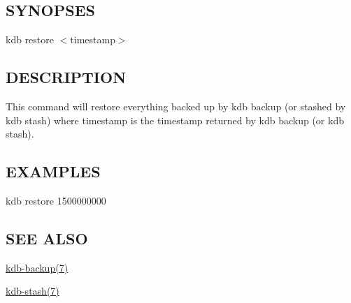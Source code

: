 \subsection*{S\+Y\+N\+O\+P\+S\+ES}

{\ttfamily kdb restore $<$timestamp$>$}

\subsection*{D\+E\+S\+C\+R\+I\+P\+T\+I\+ON}

This command will restore everything backed up by {\ttfamily kdb backup} (or stashed by {\ttfamily kdb stash}) where {\ttfamily timestamp} is the timestamp returned by {\ttfamily kdb backup} (or {\ttfamily kdb stash}).

\subsection*{E\+X\+A\+M\+P\+L\+ES}


\begin{DoxyCode}
kdb restore 1500000000
\end{DoxyCode}


\subsection*{S\+EE A\+L\+SO}


\begin{DoxyItemize}
\item \hyperlink{doc_help_kdb-backup_md}{kdb-\/backup(7)}
\item \hyperlink{doc_help_kdb-stash_md}{kdb-\/stash(7)} 
\end{DoxyItemize}